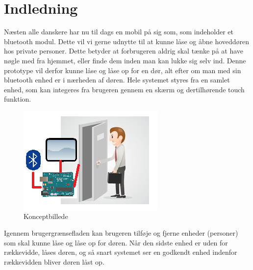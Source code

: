 \graphicspath{{Chapters/Indledning/}}

\section{Indledning}
Næsten alle danskere har nu til dags en mobil på sig som, som indeholder et bluetooth modul. Dette vil vi gerne udnytte til at kunne låse og åbne hoveddøren hos private personer. Dette betyder at forbrugeren aldrig skal tænke på at have nøgle med fra hjemmet, eller finde dem inden man kan lukke sig selv ind. 
Denne prototype vil derfor kunne låse og låse op for en dør, alt efter om man med sin bluetooth enhed er i nærheden af døren. Hele systemet styres fra en samlet enhed, som kan integeres fra brugeren gennem en skærm og dertilhørende touch funktion. 

\begin{figure}[H]
	\centering
	\includegraphics[width = 300 pt]{Img/Konceptbillede.png}
	\caption{Konceptbillede}
	\label{fig:Konceptbillede}
\end{figure}

Igennem brugergrænsefladen kan brugeren tilføje og fjerne enheder (personer) som skal kunne låse og låse op for døren. Når den sidste enhed er uden for rækkevidde, låses døren, og så snart systemet ser en godkendt enhed indenfor rækkevidden bliver døren låst op. 

